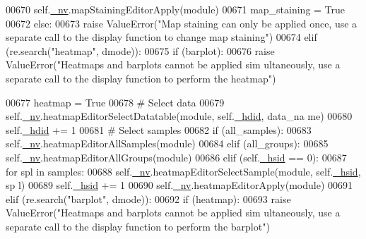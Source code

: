 \begin{DoxyCode}
00670                     self.\hyperlink{classnavicom_1_1navicom_1_1NaviCom_afff3fd56fa16a68bab52ba8d801e325a}{_nv}.mapStainingEditorApply(module)
00671                     map\_staining = \textcolor{keyword}{True}
00672                 \textcolor{keywordflow}{else}:
00673                     \textcolor{keywordflow}{raise} ValueError(\textcolor{stringliteral}{"Map staining can only be applied once, use 
      a separate call to the display function to change map staining"})
00674             \textcolor{keywordflow}{elif} (re.search(\textcolor{stringliteral}{"heatmap"}, dmode)):
00675                 \textcolor{keywordflow}{if} (barplot):
00676                     \textcolor{keywordflow}{raise} ValueError(\textcolor{stringliteral}{"Heatmaps and barplots cannot be applied sim
      ultaneously, use a separate call to the display function to perform the heatmap"})
      
00677                 heatmap = \textcolor{keyword}{True}
00678                 \textcolor{comment}{# Select data}
00679                 self.\hyperlink{classnavicom_1_1navicom_1_1NaviCom_afff3fd56fa16a68bab52ba8d801e325a}{_nv}.heatmapEditorSelectDatatable(module, self.\hyperlink{classnavicom_1_1navicom_1_1NaviCom_a095a4a928f1f09319fafc949f8580f78}{_hdid}, data\_na
      me)
00680                 self.\hyperlink{classnavicom_1_1navicom_1_1NaviCom_a095a4a928f1f09319fafc949f8580f78}{_hdid} += 1
00681                 \textcolor{comment}{# Select samples}
00682                 \textcolor{keywordflow}{if} (all\_samples):
00683                     self.\hyperlink{classnavicom_1_1navicom_1_1NaviCom_afff3fd56fa16a68bab52ba8d801e325a}{_nv}.heatmapEditorAllSamples(module)
00684                 \textcolor{keywordflow}{elif} (all\_groups):
00685                     self.\hyperlink{classnavicom_1_1navicom_1_1NaviCom_afff3fd56fa16a68bab52ba8d801e325a}{_nv}.heatmapEditorAllGroups(module)
00686                 \textcolor{keywordflow}{elif} (self.\hyperlink{classnavicom_1_1navicom_1_1NaviCom_abf768fde5caf68a79e19385b48ea0bcc}{_hsid} == 0):
00687                     \textcolor{keywordflow}{for} spl \textcolor{keywordflow}{in} samples:
00688                         self.\hyperlink{classnavicom_1_1navicom_1_1NaviCom_afff3fd56fa16a68bab52ba8d801e325a}{_nv}.heatmapEditorSelectSample(module, self.\hyperlink{classnavicom_1_1navicom_1_1NaviCom_abf768fde5caf68a79e19385b48ea0bcc}{_hsid}, sp
      l)
00689                         self.\hyperlink{classnavicom_1_1navicom_1_1NaviCom_abf768fde5caf68a79e19385b48ea0bcc}{_hsid} += 1
00690                     self.\hyperlink{classnavicom_1_1navicom_1_1NaviCom_afff3fd56fa16a68bab52ba8d801e325a}{_nv}.heatmapEditorApply(module)
00691             \textcolor{keywordflow}{elif} (re.search(\textcolor{stringliteral}{"barplot"}, dmode)):
00692                 \textcolor{keywordflow}{if} (heatmap):
00693                     \textcolor{keywordflow}{raise} ValueError(\textcolor{stringliteral}{"Heatmaps and barplots cannot be applied sim
      ultaneously, use a separate call to the display function to perform the barplot"})
      

\end{DoxyCode}
